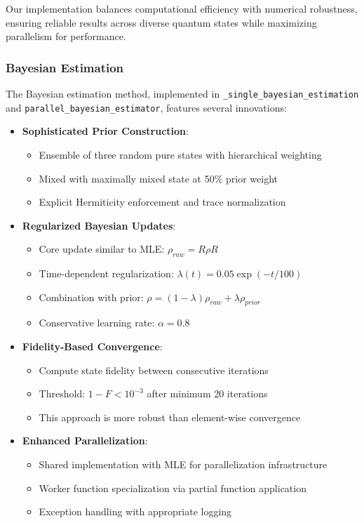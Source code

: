 \documentclass{optica-article}
\begin{document}
Our implementation balances computational efficiency with numerical robustness, ensuring reliable results across diverse quantum states while maximizing parallelism for performance.

\subsubsection{Bayesian Estimation}

The Bayesian estimation method, implemented in \texttt{\_single\_bayesian\_estimation} and \texttt{parallel\_bayesian\_estimator}, features several innovations:

\begin{itemize}
\item \textbf{Sophisticated Prior Construction}:
\begin{itemize}
\item Ensemble of three random pure states with hierarchical weighting
\item Mixed with maximally mixed state at 50\% prior weight
\item Explicit Hermiticity enforcement and trace normalization
\end{itemize}

\item \textbf{Regularized Bayesian Updates}:
\begin{itemize}
\item Core update similar to MLE: $\rho_{raw} = R\rho R$
\item Time-dependent regularization: $\lambda(t) = 0.05 \exp(-t/100)$
\item Combination with prior: $\rho = (1-\lambda)\rho_{raw} + \lambda\rho_{prior}$
\item Conservative learning rate: $\alpha = 0.8$
\end{itemize}

\item \textbf{Fidelity-Based Convergence}:
\begin{itemize}
\item Compute state fidelity between consecutive iterations
\item Threshold: $1 - F < 10^{-3}$ after minimum 20 iterations
\item This approach is more robust than element-wise convergence
\end{itemize}

\item \textbf{Enhanced Parallelization}:
\begin{itemize}
\item Shared implementation with MLE for parallelization infrastructure
\item Worker function specialization via partial function application
\item Exception handling with appropriate logging
\end{itemize}
\end{itemize}
\end{document}
